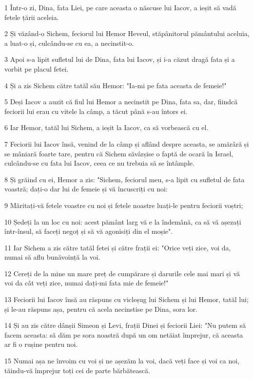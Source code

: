 \par 1 Într-o zi, Dina, fata Liei, pe care aceasta o născuse lui Iacov, a ieșit să vadă fetele țării aceleia.
\par 2 Și văzând-o Sichem, feciorul lui Hemor Heveul, stăpânitorul pământului aceluia, a luat-o și, culcându-se cu ea, a necinstit-o.
\par 3 Apoi s-a lipit sufletul lui de Dina, fata lui Iacov, și i-a căzut dragă fata și a vorbit pe placul fetei.
\par 4 Și a zis Sichem către tatăl său Hemor: "Ia-mi pe fata aceasta de femeie!"
\par 5 Deși Iacov a auzit că fiul lui Hemor a necinstit pe Dina, fata sa, dar, fiindcă feciorii lui erau cu vitele la câmp, a tăcut până s-au întors ei.
\par 6 Iar Hemor, tatăl lui Sichem, a ieșit la Iacov, ca să vorbească cu el.
\par 7 Feciorii lui Iacov însă, venind de la câmp și aflând despre aceasta, se amărâră și se mâniară foarte tare, pentru că Sichem săvârșise o faptă de ocară în Israel, culcându-se cu fata lui Iacov, ceea ce nu trebuia să se întâmple.
\par 8 Și grăind cu ei, Hemor a zis: "Sichem, feciorul meu, s-a lipit cu sufletul de fata voastră; dați-o dar lui de femeie și vă încuscriți cu noi:
\par 9 Măritați-vă fetele voastre cu noi și fetele noastre luați-le pentru feciorii voștri;
\par 10 Ședeți la un loc cu noi: acest pământ larg vă e la îndemână, ca să vă așezați într-însul, să faceți negoț și să vă agonisiți din el moșie".
\par 11 Iar Sichem a zis către tatăl fetei și către frații ei: "Orice veți zice, voi da, numai să aflu bunăvoință la voi.
\par 12 Cereți de la mine un mare preț de cumpărare și darurile cele mai mari și vă voi da cât veți zice, numai dați-mi fata mie de femeie!"
\par 13 Feciorii lui Iacov însă au răspuns cu vicleșug lui Sichem și lui Hemor, tatăl lui; și le-au răspuns așa, pentru că acela necinstise pe Dina, sora lor.
\par 14 Și au zis către dânșii Simeon și Levi, frații Dinei și feciorii Liei: "Nu putem să facem aceasta: să dăm pe sora noastră după un om netăiat împrejur, că aceasta ar fi o rușine pentru noi.
\par 15 Numai așa ne învoim cu voi și ne așezăm la voi, dacă veți face și voi ca noi, tăindu-vă împrejur toți cei de parte bărbătească.

